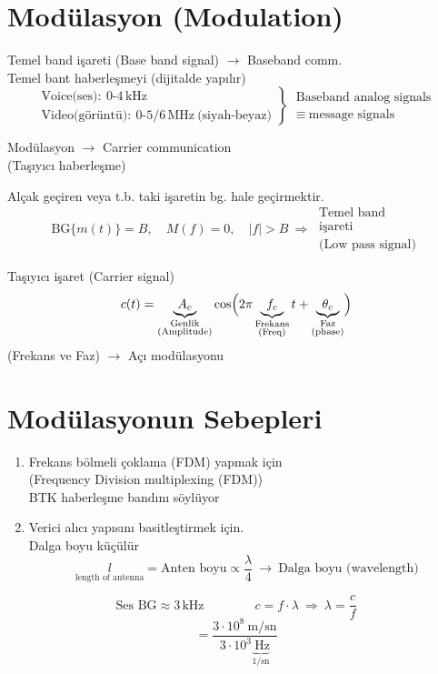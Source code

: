 \documentclass[11pt,a4paper]{article}
\begin{document}
\section{Modülasyon (Modulation)}
Temel band işareti (Base band signal) $\rightarrow$ Baseband comm.\\
Temel bant haberleşmeyi (dijitalde yapılır)
\[
\left.\begin{array}{l}\text{Voice(ses)}:\ 0\text{-}4\,\mathrm{kHz}\\ \text{Video(görüntü)}:\ 0\text{-}5/6\,\mathrm{MHz}\ \text{(siyah-beyaz)}\end{array}\right\}\ \begin{array}{l}\text{Baseband analog signals}\\ \equiv\ \text{message signals}\end{array}
\]

Modülasyon $\rightarrow$ Carrier communication\\
(Taşıyıcı haberleşme)

Alçak geçiren veya t.b. taki işaretin bg. hale geçirmektir.
\[
\mathrm{BG}\{m(t)\}=B,\quad M(f)=0,\quad |f|>B\ \Rightarrow\ \begin{array}{l}\text{Temel band}\\\text{işareti}\\\text{(Low pass signal)}\end{array}
\]

Taşıyıcı işaret (Carrier signal)
\[
c(t)=\underbrace{A_c}_{\substack{\text{Genlik}\\\text{(Amplitude)}}}\cos\Bigl(2\pi\underbrace{f_c}_{\substack{\text{Frekans}\\\text{(Freq)}}}t+\underbrace{\theta_c}_{\substack{\text{Faz}\\\text{(phase)}}}\Bigr)
\]
(Frekans ve Faz) $\rightarrow$ Açı modülasyonu

\section{Modülasyonun Sebepleri}
\begin{enumerate}[label=\arabic*)]
\item Frekans bölmeli çoklama (FDM) yapmak için\\
(Frequency Division multiplexing (FDM))\\
BTK haberleşme bandını söylüyor
\item Verici alıcı yapısını basitleştirmek için.\\
Dalga boyu küçülür
\[
\underset{\text{length of antenna}}{l}=\text{Anten boyu}\propto\frac{\lambda}{4}\ \rightarrow\ \text{Dalga boyu (wavelength)}
\]
\end{enumerate}
\[
\text{Ses BG}\approx3\,\mathrm{kHz}\qquad\qquad c=f\cdot\lambda\ \Rightarrow\ \lambda=\frac{c}{f}
\]
\[
=\frac{3\cdot10^8\ \mathrm{m/sn}}{3\cdot10^3\underbrace{\ \mathrm{Hz}}_{1/\mathrm{sn}}}
\]
\end{document}
